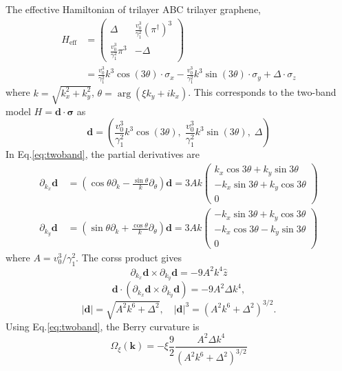 \documentclass[12pt,a4paper]{article}
\begin{document}
    The effective Hamiltonian of trilayer ABC trilayer graphene,
    \begin{align*}
        H_{\text{eff}}
        & = \begin{pmatrix}
            \Delta & \frac{v_0^3}{\gamma_1^2} (\pi^\dagger)^3 \\
            \frac{v_0^3}{\gamma_1^2} \pi^3 & -\Delta
        \end{pmatrix} \\
        & = \frac{v_0^3}{\gamma_1^2} k^3\cos(3\theta) \cdot \sigma_x
        - \frac{v_0^3}{\gamma_1^2} k^3\sin(3\theta) \cdot \sigma_y
        + \Delta \cdot \sigma_z
    \end{align*}
    where $k = \sqrt{k_x^2 + k_y^2}$, $\theta = \arg(\xi k_y + ik_x)$. This corresponds to the two-band model $H = \mathbf{d}\cdot\bm{\sigma}$ as
    \[
    \mathbf{d} = \left(
    \frac{v_0^3}{\gamma_1^2} k^3 \cos(3\theta), \;
    \frac{v_0^3}{\gamma_1^2} k^3 \sin(3\theta), \;
    \Delta\right)
    \]
    In Eq.\eqref{eq:twoband}, the partial derivatives are
    \[\begin{aligned}
        \partial_{k_x} \mathbf{d}
        &\, = \left(\cos\theta \partial_k - \frac{\sin\theta}{k}\partial_\theta\right) \mathbf{d}
        = 3A k \begin{pmatrix}
        k_x \cos 3\theta + k_y \sin 3\theta \\
        -k_x \sin 3\theta + k_y \cos 3\theta \\
        0
        \end{pmatrix} \\
        \partial_{k_y} \mathbf{d}
        &\, = \left(\sin\theta \partial_k + \frac{\cos\theta}{k}\partial_\theta\right) \mathbf{d}
        = 3A k \begin{pmatrix}
            -k_x \sin 3\theta + k_y \cos 3\theta \\
            -k_x \cos 3\theta - k_y \sin 3\theta \\
            0
        \end{pmatrix}
    \end{aligned}\]
    where $A = v_0^3/\gamma_1^2$. The corss product gives
    \[
        \partial_{k_x} \mathbf{d} \times \partial_{k_y} \mathbf{d} = -9 A^2 k^4 \hat{z}
    \]
    \[
        \mathbf{d} \cdot (\partial_{k_x} \mathbf{d} \times \partial_{k_y} \mathbf{d}) = -9 A^2 \Delta k^4,
    \]
    \[
        |\mathbf{d}| = \sqrt{A^2 k^6 + \Delta^2}, \quad |\mathbf{d}|^3 = (A^2 k^6 + \Delta^2)^{3/2}.
    \]
    Using Eq.\eqref{eq:twoband}, the Berry curvature is
    \begin{equation}
    \label{eq:Omega_ABC}
        \Omega_{\xi}(\mathbf{k})
        = -\xi\frac{9}{2} \frac{ A^2 \Delta k^4}{(A^2 k^6 + \Delta^2)^{3/2}}
    \end{equation}
\end{document}
